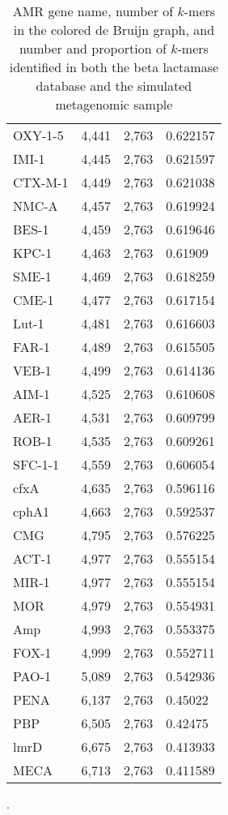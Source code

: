 \documentclass{article}
\begin{document}
\begin{table}[h!]
\begin{tabular}{l|c|c|l}
OXY-1-5 & 4,441 & 2,763 & 0.622157\\
IMI-1 & 4,445 & 2,763 & 0.621597\\
CTX-M-1 & 4,449 & 2,763 & 0.621038\\
NMC-A & 4,457 & 2,763 & 0.619924\\
BES-1 & 4,459 & 2,763 & 0.619646\\
KPC-1 & 4,463 & 2,763 & 0.61909\\
SME-1 & 4,469 & 2,763 & 0.618259\\
CME-1 & 4,477 & 2,763 & 0.617154\\
Lut-1 & 4,481 & 2,763 & 0.616603\\
FAR-1 & 4,489 & 2,763 & 0.615505\\
VEB-1 & 4,499 & 2,763 & 0.614136\\
AIM-1 & 4,525 & 2,763 & 0.610608\\
AER-1 & 4,531 & 2,763 & 0.609799\\
ROB-1 & 4,535 & 2,763 & 0.609261\\
SFC-1-1 & 4,559 & 2,763 & 0.606054\\
cfxA & 4,635 & 2,763 & 0.596116\\
cphA1 & 4,663 & 2,763 & 0.592537\\
CMG & 4,795 & 2,763 & 0.576225\\
ACT-1 & 4,977 & 2,763 & 0.555154\\
MIR-1 & 4,977 & 2,763 & 0.555154\\
MOR & 4,979 & 2,763 & 0.554931\\
Amp & 4,993 & 2,763 & 0.553375\\
FOX-1 & 4,999 & 2,763 & 0.552711\\
PAO-1 & 5,089 & 2,763 & 0.542936\\
PENA & 6,137 & 2,763 & 0.45022\\
PBP & 6,505 & 2,763 & 0.42475\\
lmrD & 6,675 & 2,763 & 0.413933\\
MECA & 6,713 & 2,763 & 0.411589\\	
 	\end{tabular} 
      \caption{AMR gene name, number of $k$-mers in the colored de Bruijn graph, and number and proportion of $k$-mers identified in both the beta lactamase database and the simulated metagenomic sample}.
 \label{amr2}
\end{table}
\end{document}

